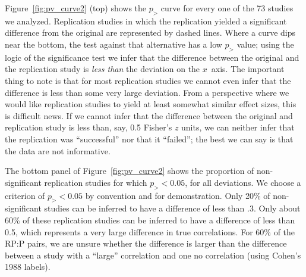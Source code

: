 \documentclass[doc,a4paper,floatsintext,draftfirst]{apa6}
\begin{document}
Figure~\ref{fig:pv_curve2} (top) shows the $p_{>}$ curve for every one of the 73 studies we analyzed. Replication studies in which the replication yielded a significant difference from the original are represented by dashed lines. Where a curve dips near the bottom, the test against that alternative has a low $p_{>}$ value; using the logic of the significance test we infer that the difference between the original and the replication study is {\em less than} the deviation on the $x$~axis. The important thing to note is that for most replication studies we cannot even infer that the difference is less than some very large deviation. From a perspective where we would like replication studies to yield at least somewhat similar effect sizes, this is difficult news. If we cannot infer that the difference between the original and replication study is less than, say, 0.5 Fisher's $z$ units, we can neither infer that the replication was ``successful'' nor that it ``failed''; the best we can say is that the data are not informative.

The bottom panel of Figure~\ref{fig:pv_curve2} shows the proportion of non-significant replication studies for which $p_{>}<0.05$, for all deviations. We choose a criterion of $p_{>}<0.05$ by convention and for demonstration. Only 20\% of non-significant studies can be inferred to have a difference of less than .3. Only about 60\% of these replication studies can be inferred to have a difference of less than 0.5, which represents a very large difference in true correlations. For 60\% of the RP:P pairs, we are unsure whether the difference is larger than the difference between a study with a ``large'' correlation and one no correlation (using Cohen's 1988 labels). 

\nocite{Cohen:1988}
\end{document}
